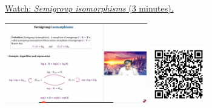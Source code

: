 
\begin{minipage}{10cm}
    \href{https://act4e-spring21.netlify.app/videos/spring2021-morphisms:morphisms:semigroup-morphisms:semigroup-isomorphisms.html}{Watch: \emph{Semigroup isomorphisms} (3 minutes).}
        
    \href{https://act4e-spring21.netlify.app/videos/spring2021-morphisms:morphisms:semigroup-morphisms:semigroup-isomorphisms.html}{\includegraphics[height=3.5cm]{spring2021-morphisms:morphisms:semigroup-morphisms:semigroup-isomorphisms/thumbnails.jpg}}
    \href{https://act4e-spring21.netlify.app/videos/spring2021-morphisms:morphisms:semigroup-morphisms:semigroup-isomorphisms.html}{\includegraphics[height=2.5cm]{spring2021-morphisms:morphisms:semigroup-morphisms:semigroup-isomorphisms/qrcode.png}}
\end{minipage}
